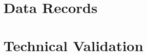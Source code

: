 \documentclass[fleqn,10pt]{wlscirep}
\begin{document}



 

\section*{Data Records}



\section*{Technical Validation}

\end{document}
